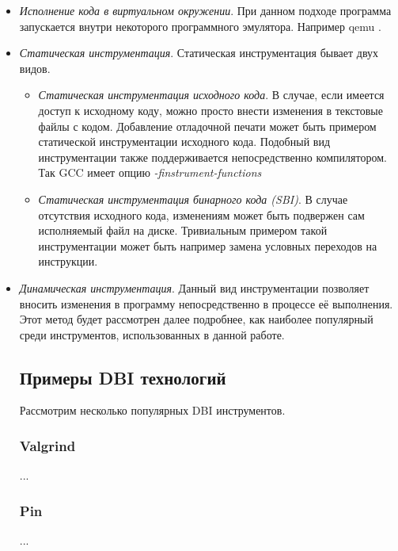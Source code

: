 \begin{itemize}
\item {\em Исполнение кода в виртуальном окружении}. При данном подходе программа запускается внутри некоторого программного эмулятора. Например qemu \cite{QEMU}.

\item {\em Статическая инструментация}.
Статическая инструментация бывает двух видов.
    \begin{itemize}
        \item {\em Статическая инструментация исходного кода}. В случае, если имеется доступ к исходному коду, можно просто внести изменения в текстовые файлы с кодом. Добавление отладочной печати может быть примером статической инструментации исходного кода. Подобный вид инструментации также поддерживается непосредственно компилятором. Так GCC имеет опцию  \textit{-finstrument-functions}
        \item {\em Статическая инструментация бинарного кода (SBI)}. В случае отсутствия исходного кода, изменениям может быть подвержен сам исполняемый файл на диске. Тривиальным примером такой инструментации может быть например замена условных переходов на  инструкции. 
    \end{itemize}

\item {\em Динамическая инструментация}. Данный вид инструментации позволяет вносить изменения в программу непосредственно в процессе её выполнения. Этот метод будет рассмотрен далее подробнее, как наиболее популярный среди инструментов, использованных в данной работе.


\subsection{Примеры DBI технологий}

Рассмотрим несколько популярных DBI инструментов.

\subsubsection{Valgrind}
...

\subsubsection{Pin}
...


\end{itemize}
